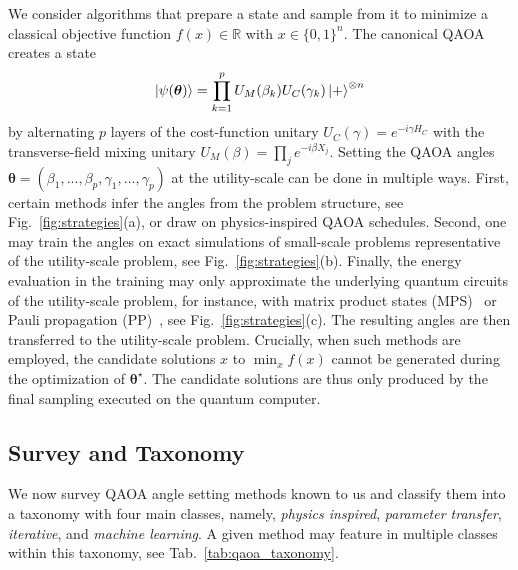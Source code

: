 \documentclass[twocolumn,
english,
aps,
pra,
10pt,
longbibliography,
superscriptaddress,
amsmath,
amssymb,
floatfix
]{revtex4-2}
\begin{document}
We consider algorithms that prepare a state and sample from it to minimize a classical objective function $f(x)\in \mathbb{R}$ with $x\in\{0,1\}^n$. 
The canonical QAOA~\cite{Farhi2014} creates a state 
\begin{align}
    \ket{\psi(\boldsymbol{\theta})}=\prod_{k=1}^pU_M(\beta_k)U_C(\gamma_k)\ket{+}^{\otimes n}
\end{align}
by alternating $p$ layers of the cost-function unitary $U_C(\gamma) = e^{-i\gamma H_C}$ with the transverse-field mixing unitary $U_M(\beta) = \prod_j e^{-i\beta X_j}$.
Setting the QAOA angles $\boldsymbol{\theta}=(\beta_1, ..., \beta_p, \gamma_1, ...,\gamma_p)$ at the utility-scale can be done in multiple ways.
First, certain methods infer the angles from the problem structure, see Fig.~\ref{fig:strategies}(a), or draw on physics-inspired QAOA schedules.
Second, one may train the angles on exact simulations of small-scale problems representative of the utility-scale problem, see Fig.~\ref{fig:strategies}(b).
Finally, the energy evaluation in the training may only approximate the underlying quantum circuits of the utility-scale problem, for instance, with matrix product states (MPS)~\cite{Schollwoeck2011_DMRG, Stoudenmire2020_Limits-QC} or Pauli propagation (PP)~\cite{rudolph2025pauli, rall2019simulation}, see Fig.~\ref{fig:strategies}(c).
The resulting angles are then transferred to the utility-scale problem.
Crucially, when such methods are employed, the candidate solutions $x$ to $\min_x f(x)$ cannot be generated during the optimization of $\boldsymbol{\theta}^\star$.
The candidate solutions are thus only produced by the final sampling executed on the quantum computer.

\subsection{Survey and Taxonomy\label{sec:overview}}

We now survey QAOA angle setting methods known to us and classify them into a taxonomy with four main classes, namely, \emph{physics inspired}, \emph{parameter transfer}, \emph{iterative}, and \emph{machine learning}.
A given method may feature in multiple classes within this taxonomy, see Tab.~\ref{tab:qaoa_taxonomy}.
\end{document}
